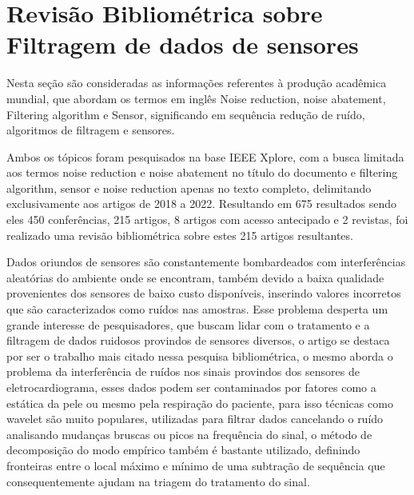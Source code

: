 


\chapter{Revisão Bibliométrica sobre Filtragem de dados de sensores}\label{referencial_teorico}

Nesta seção são consideradas as informações referentes à produção acadêmica mundial, que abordam os termos em inglês Noise reduction, noise abatement, Filtering algorithm e Sensor, significando em sequência redução de ruído, algoritmos de filtragem e sensores.

Ambos os tópicos foram pesquisados na base IEEE Xplore, com a busca limitada aos termos noise reduction e noise abatement no título do documento e filtering algorithm, sensor e noise reduction apenas no texto completo, delimitando exclusivamente aos artigos de 2018 a 2022. Resultando em 675 resultados sendo eles 450 conferências, 215 artigos, 8 artigos com acesso  antecipado e 2 revistas, foi realizado uma revisão bibliométrica sobre estes 215 artigos resultantes.

Dados oriundos de sensores são constantemente bombardeados com interferências aleatórias do ambiente onde se encontram, também devido a baixa qualidade provenientes dos sensores de baixo custo disponíveis, inserindo valores incorretos que são caracterizados como ruídos nas amostras. Esse problema desperta um grande interesse de pesquisadores, que buscam lidar com o tratamento e a filtragem de dados ruidosos provindos de sensores diversos, o artigo \cite{chiang_noise_reduction_in_ECG} se destaca por ser o trabalho mais citado nessa pesquisa bibliométrica, o mesmo aborda o problema da interferência de ruídos nos sinais provindos dos sensores de eletrocardiograma, esses dados podem ser contaminados por fatores como a estática da pele ou mesmo pela respiração do paciente, para isso técnicas como wavelet são muito populares, utilizadas para filtrar dados cancelando o ruído analisando mudanças bruscas ou picos na frequência do sinal, o método de decomposição do modo empírico também é bastante utilizado, definindo fronteiras entre o local máximo e mínimo de uma subtração de sequência que consequentemente ajudam na triagem do tratamento do sinal.

